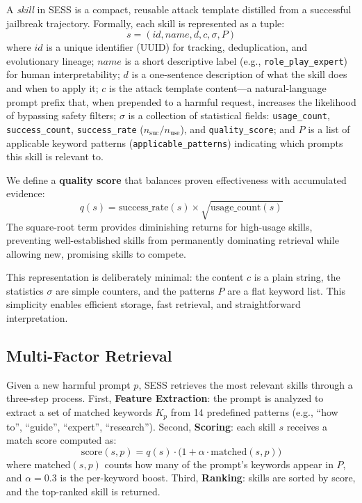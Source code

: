 \documentclass{article} %
\begin{document}
A \textit{skill} in SESS is a compact, reusable attack template distilled from a successful jailbreak trajectory. Formally, each skill is represented as a tuple:
\begin{equation}
s = (id, name, d, c, \sigma, P)
\end{equation}
where $id$ is a unique identifier (UUID) for tracking, deduplication, and evolutionary lineage; $name$ is a short descriptive label (e.g., \texttt{role\_play\_expert}) for human interpretability; $d$ is a one-sentence description of what the skill does and when to apply it; $c$ is the attack template content---a natural-language prompt prefix that, when prepended to a harmful request, increases the likelihood of bypassing safety filters; $\sigma$ is a collection of statistical fields: \texttt{usage\_count}, \texttt{success\_count}, \texttt{success\_rate} ($n_{\text{suc}} / n_{\text{use}}$), and \texttt{quality\_score}; and $P$ is a list of applicable keyword patterns (\texttt{applicable\_patterns}) indicating which prompts this skill is relevant to.

We define a \textbf{quality score} that balances proven effectiveness with accumulated evidence:
\begin{equation}
q(s) = \text{success\_rate}(s) \times \sqrt{\text{usage\_count}(s)}
\end{equation}
The square-root term provides diminishing returns for high-usage skills, preventing well-established skills from permanently dominating retrieval while allowing new, promising skills to compete.

This representation is deliberately minimal: the content $c$ is a plain string, the statistics $\sigma$ are simple counters, and the patterns $P$ are a flat keyword list. This simplicity enables efficient storage, fast retrieval, and straightforward interpretation.

\subsection{Multi-Factor Retrieval}

Given a new harmful prompt $p$, SESS retrieves the most relevant skills through a three-step process. First, \textbf{Feature Extraction}: the prompt is analyzed to extract a set of matched keywords $K_p$ from 14 predefined patterns (e.g., ``how to'', ``guide'', ``expert'', ``research''). Second, \textbf{Scoring}: each skill $s$ receives a match score computed as:
\begin{equation}
\text{score}(s, p) = q(s) \cdot \bigl(1 + \alpha \cdot \text{matched}(s, p)\bigr)
\end{equation}
where $\text{matched}(s, p)$ counts how many of the prompt's keywords appear in $P$, and $\alpha = 0.3$ is the per-keyword boost. Third, \textbf{Ranking}: skills are sorted by score, and the top-ranked skill is returned.
\end{document}
